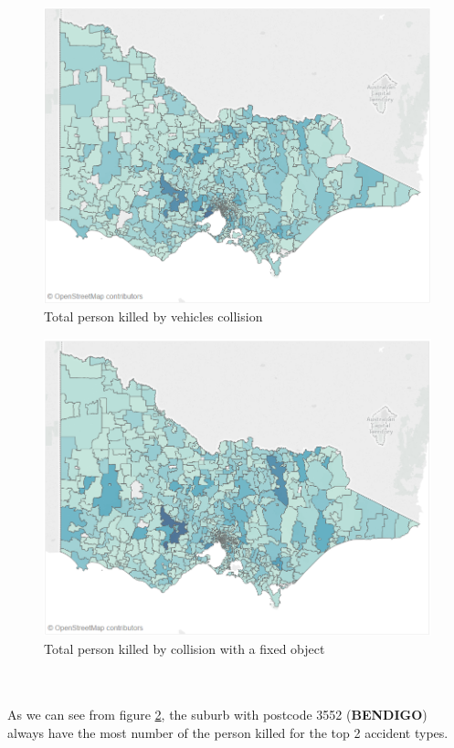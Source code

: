 \documentclass[10pt]{article}
\theoremstyle{definition}
\begin{document}
\begin{minipage}{\linewidth}
  	\centering
  \begin{minipage}{0.49\linewidth}
	\begin{figure}[H]
            \includegraphics[width=\linewidth]{images/mapTypeVehicle.png}
			\caption{Total person killed by vehicles collision }
			\label{fig:mapTypeVehicle}
    \end{figure}
  \end{minipage}
  \hspace{0.0\linewidth}
  \begin{minipage}{0.49\linewidth}
     \begin{figure}[H]
            \includegraphics[width=\linewidth]{images/mapTypeObj.png}
			\caption{Total person killed by collision with a fixed object}
			\label{fig:mapTypeObj}
    \end{figure}
    \end{minipage}
\end{minipage}\\
\vspace{12pt}\\
As we can see from figure \ref{fig:mapTypeObj}, the suburb with postcode 3552 (\textbf{BENDIGO}) always have the most number of the person killed for the top 2 accident types.\par
\end{document}
